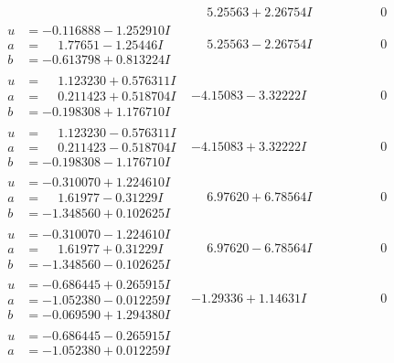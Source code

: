 \documentclass[1p]{elsarticle_modified}
\theoremstyle{definition}
\begin{document}
$$\begin{array}{c|c|c}
 & \phantom{-}5.25563 + 2.26754 I & \phantom{-0.000000 } 0 \\ \hline\begin{aligned}
u &= -0.116888 - 1.252910 I \\
a &= \phantom{-}1.77651 - 1.25446 I \\
b &= -0.613798 + 0.813224 I\end{aligned}
 & \phantom{-}5.25563 - 2.26754 I & \phantom{-0.000000 } 0 \\ \hline\begin{aligned}
u &= \phantom{-}1.123230 + 0.576311 I \\
a &= \phantom{-}0.211423 + 0.518704 I \\
b &= -0.198308 + 1.176710 I\end{aligned}
 & -4.15083 - 3.32222 I & \phantom{-0.000000 } 0 \\ \hline\begin{aligned}
u &= \phantom{-}1.123230 - 0.576311 I \\
a &= \phantom{-}0.211423 - 0.518704 I \\
b &= -0.198308 - 1.176710 I\end{aligned}
 & -4.15083 + 3.32222 I & \phantom{-0.000000 } 0 \\ \hline\begin{aligned}
u &= -0.310070 + 1.224610 I \\
a &= \phantom{-}1.61977 - 0.31229 I \\
b &= -1.348560 + 0.102625 I\end{aligned}
 & \phantom{-}6.97620 + 6.78564 I & \phantom{-0.000000 } 0 \\ \hline\begin{aligned}
u &= -0.310070 - 1.224610 I \\
a &= \phantom{-}1.61977 + 0.31229 I \\
b &= -1.348560 - 0.102625 I\end{aligned}
 & \phantom{-}6.97620 - 6.78564 I & \phantom{-0.000000 } 0 \\ \hline\begin{aligned}
u &= -0.686445 + 0.265915 I \\
a &= -1.052380 - 0.012259 I \\
b &= -0.069590 + 1.294380 I\end{aligned}
 & -1.29336 + 1.14631 I & \phantom{-0.000000 } 0 \\ \hline\begin{aligned}
u &= -0.686445 - 0.265915 I \\
a &= -1.052380 + 0.012259 I \\

\end{aligned}
\end{array}$$
\end{document}
